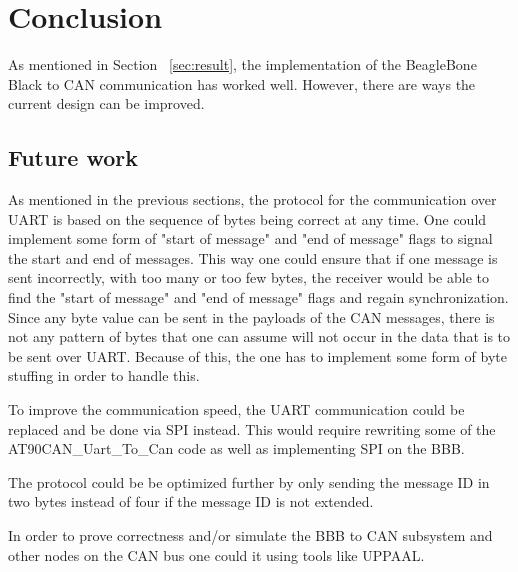 
\section{Conclusion}\label{sec:conclusion}
As mentioned in Section ~\ref{sec:result}, the implementation of the BeagleBone Black to CAN communication has worked well. However, there are ways the current design can be improved.

\subsection{Future work}
As mentioned in the previous sections, the protocol for the communication over UART is based on the sequence of bytes being correct at any time. One could implement some form of "start of message" and "end of message" flags to signal the start and end of messages. This way one could ensure that if one message is sent incorrectly, with too many or too few bytes, the receiver would be able to find the "start of message" and "end of message" flags and regain synchronization. \newline
Since any byte value can be sent in the payloads of the CAN messages, there is not any pattern of bytes that one can assume will not occur in the data that is to be sent over UART. Because of this, the one has to implement some form of byte stuffing in order to handle this.

To improve the communication speed, the UART communication could be replaced and be done via SPI instead. This would require rewriting some of the AT90CAN\_Uart\_To\_Can code as well as implementing SPI on the BBB.

The protocol could be be optimized further by only sending the message ID in two bytes instead of four if the message ID is not extended.

In order to prove correctness and/or simulate the BBB to CAN subsystem and other nodes on the CAN bus one could it using tools like UPPAAL.

